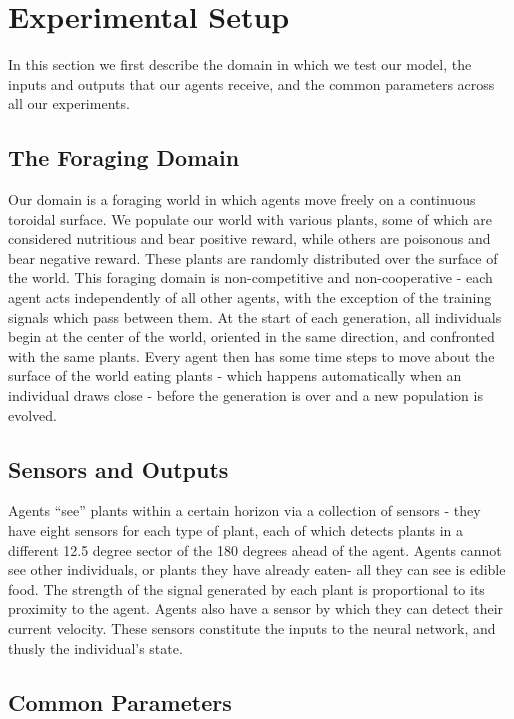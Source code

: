 \documentclass{acm_proc_article-sp}
\begin{document}
\section{Experimental Setup}
\label{sec:setup}
In this section we first describe the domain in which we test our model, the inputs and outputs that our agents receive, and the common parameters across all our experiments.

\subsection*{The Foraging Domain}
    Our domain is a foraging world in which agents move freely on a continuous toroidal surface. We populate our world with various plants, some of which are considered nutritious and bear positive reward, while others are poisonous and bear negative reward. These plants are randomly distributed over the surface of the world. This foraging domain is non-competitive and non-cooperative - each agent acts independently of all other agents, with the exception of the training signals which pass between them. At the start of each generation, all individuals begin at the center of the world, oriented in the same direction, and confronted with the same plants. Every agent then has some time steps to move about the surface of the world eating plants - which happens automatically when an individual draws close - before the generation is over and a new population is evolved.
    
\subsection*{Sensors and Outputs}

  Agents ``see'' plants within a certain horizon via a collection of sensors - they have eight sensors for each type of plant, each of which detects plants in a different 12.5 degree sector of the 180 degrees ahead of the agent. Agents cannot see other individuals, or plants they have already eaten- all they can see is edible food. The strength of the signal generated by each plant is proportional to its proximity to the agent. Agents also have a sensor by which they can detect their current velocity. These sensors constitute the inputs to the neural network, and thusly the individual's state.


\subsection*{Common Parameters}
\end{document}
